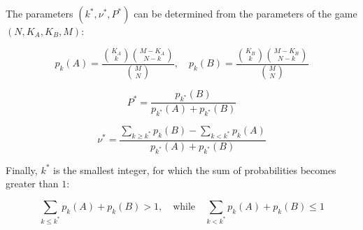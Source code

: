 \documentclass{beamer}
\theoremstyle{definition}
\begin{document}
\begin{frame}[shrink=10]{}

\begin{theorem}

The parameters $(k^*, \nu^*, P^*)$ can be determined from the parameters of the game $(N, K_A, K_B, M)$:

\begin{equation}
    \label{thm:SymEqHypergeom}
    p_k(A) = \frac{\binom{K_A}{k} \binom{M-K_A}{N-k}}{\binom{M}{N}}, \quad
    p_k(B) = \frac{\binom{K_B}{k} \binom{M-K_B}{N-k}}{\binom{M}{N}}
\end{equation}

\begin{equation}
    \label{thm:Fisher_Ps}
    P^* = \frac{p_{k^*}(B)}{p_{k^*}(A)+p_{k^*}(B)}
\end{equation}

\begin{equation}
    \label{thm:SymEqNu}
    \nu^* = \frac{\sum_{k \ge k^*} p_k(B) - \sum_{k < k^*} p_k(A)}{p_{k^*}(A)+p_{k^*}(B)}
\end{equation}

Finally, $k^*$ is the smallest integer, for which the sum of probabilities becomes greater than $1$:

\begin{equation}
    \label{thm:Fisher_ks}
    \sum_{k \le k^*} p_k(A)+p_k(B) > 1, \quad \mathrm{while} \quad \sum_{k<k^*} p_k(A)+p_k(B) \le 1
\end{equation}

\end{theorem}

\end{frame}
\end{document}
